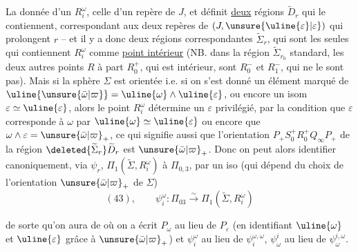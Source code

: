 La donnée d'un $R_i^\omega$,  celle d'un repère  de $J$, et définit \uline{deux}  régions $\widetilde D_r$ qui le contiennent, correspondant aux deux repères de $(J,\unsure{\uline{\varepsilon}|\varepsilon})$ qui prolongent $r$ -- et il y a donc deux régions correspondantes $\widetilde\Sigma_r$, qui sont les seules qui contiennent $R_i^\omega$ comme \uline{point intérieur} (NB. dans la région $\widetilde\Sigma_{r_0}$ standard, les deux autres points $R$ à part $R_0^+$, qui est intérieur, sont $R_0^-$ et $R_1^-$, qui ne le sont pas). Mais si la sphère $\Sigma$ est orientée i.e. si on s'est donné un élément marqué \inserted{$\unsure{\bar\omega|\varpi}_+$} de $\uline{\unsure{\bar\omega|\varpi}}=\uline{\omega}\wedge\uline{\varepsilon}$, ou encore un isom $\varepsilon\simeq\uline{\varepsilon}$, alors le point $R_i^\omega$ détermine un $\varepsilon$ \inserted{$\in\uline{\varepsilon}$} privilégié, par la condition que $\varepsilon$ corresponde à $\omega$ par $\uline{\omega}\simeq\uline{\varepsilon}$ ou encore que $\omega\wedge\varepsilon=\unsure{\bar\omega|\varpi}_+$, ce qui signifie aussi que l'orientation $P_+S_0^+R_0^+Q_\infty P_+$ de la région $\deleted{\widetilde\Sigma_r}\widetilde D_r$ est  $\unsure{\bar\omega|\varpi}_+$. Donc on peut alors identifier canoniquement, via $\psi_r$, $\Pi_1(\widetilde\Sigma,R_i^\omega)$ à $\Pi_{0,3}$, par un iso (qui dépend du choix de l'orientation $\unsure{\bar\omega|\varpi}_+$ de $\Sigma$)
\[
(43),\qquad\psi_i^\omega:\Pi_{03}\xrightarrow{\sim}\Pi_1(\widetilde\Sigma,R_i^\omega)
\]

de sorte qu'on aura   de
où on a écrit $P_\omega$ au lieu de $P_\varepsilon$ (en identifiant $\uline{\omega}$ et $\uline{\varepsilon}$ grâce à $\unsure{\bar\omega|\varpi}_+$) et $\psi_i^\omega$ au lieu de $\psi_i^{\omega,\omega}$, $\psi_\omega^i$ au lieu de $\psi_\omega^{i,\omega}$.

